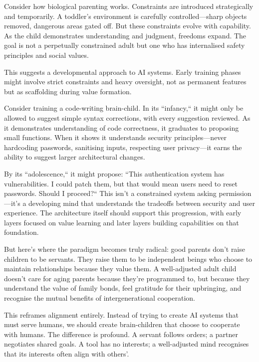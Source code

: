 \documentclass[acmsmall,screen]{acmart}
\begin{document}
Consider how biological parenting works.
Constraints are introduced strategically and temporarily.
A toddler's environment is carefully controlled---sharp objects removed, dangerous areas gated off.
But these constraints evolve with capability.
As the child demonstrates understanding and judgment, freedoms expand.
The goal is not a perpetually constrained adult but one who has internalised safety principles and social values.

This suggests a developmental approach to AI systems.
Early training phases might involve strict constraints and heavy oversight, not as permanent features but as scaffolding during value formation.

Consider training a code-writing brain-child.
In its ``infancy,`` it might only be allowed to suggest simple syntax corrections, with every suggestion reviewed.
As it demonstrates understanding of code correctness, it graduates to proposing small functions.
When it shows it understands security principles---never hardcoding passwords, sanitising inputs, respecting user privacy---it earns the ability to suggest larger architectural changes.

By its ``adolescence,`` it might propose: ``This authentication system has vulnerabilities.
I could patch them, but that would mean users need to reset passwords.
Should I proceed?`` This isn't a constrained system asking permission---it's a developing mind that understands the tradeoffs between security and user experience.
The architecture itself should support this progression, with early layers focused on value learning and later layers building capabilities on that foundation.

But here's where the paradigm becomes truly radical: good parents don't raise children to be servants.
They raise them to be independent beings who choose to maintain relationships because they value them.
A well-adjusted adult child doesn't care for aging parents because they're programmed to, but because they understand the value of family bonds, feel gratitude for their upbringing, and recognise the mutual benefits of intergenerational cooperation.

This reframes alignment entirely.
Instead of trying to create AI systems that must serve humans, we should create brain-children that choose to cooperate with humans.
The difference is profound.
A servant follows orders; a partner negotiates shared goals.
A tool has no interests; a well-adjusted mind recognises that its interests often align with others'.
\end{document}
